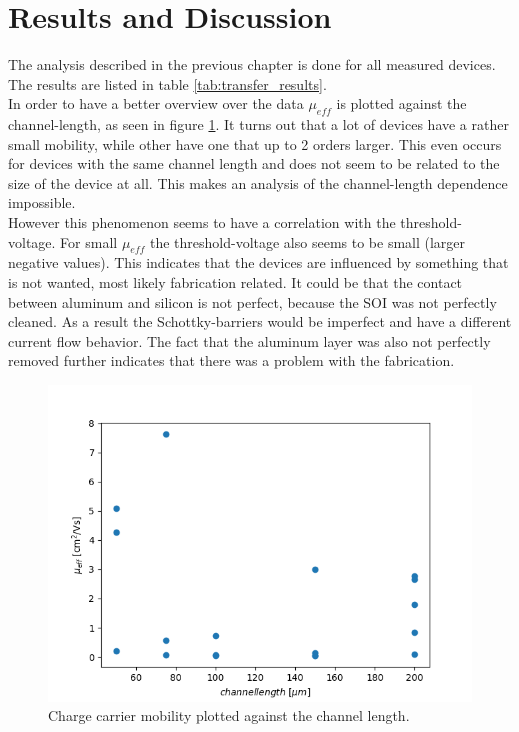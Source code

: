 \documentclass[%
 reprint,
amsmath,amssymb,
pra,
]{revtex4-1}
\begin{document}
\section{Results and Discussion}
The analysis described in the previous chapter is done for all measured devices. The results are listed in table \ref{tab:transfer_results}.\\
In order to have a better overview over the data $\mu_{eff}$ is plotted against the channel-length, as seen in figure \ref{fig:plot}. It turns out that a lot of devices have a rather small mobility, while other have one that up to 2 orders larger. This even occurs for devices with the same channel length and does not seem to be related to the size of the device at all. This makes an analysis of the channel-length dependence impossible.\\
However this phenomenon seems to have a correlation with the threshold- voltage. For small $\mu_{eff}$ the threshold-voltage also seems to be small (larger negative values). This indicates that the devices are influenced by something that is not wanted, most likely fabrication related. It could be that the contact between aluminum and silicon is not perfect, because the SOI was not perfectly cleaned. As a result the Schottky-barriers would be imperfect and have a different current flow behavior. The fact that the aluminum layer was also not perfectly removed further indicates that there was a problem with the fabrication.
\begin{figure}
\centering
\includegraphics[scale=0.55]{Bilder/figure_1.png}
\caption{Charge carrier mobility plotted against the channel length.}
\label{fig:plot}
\end{figure}
\end{document}

